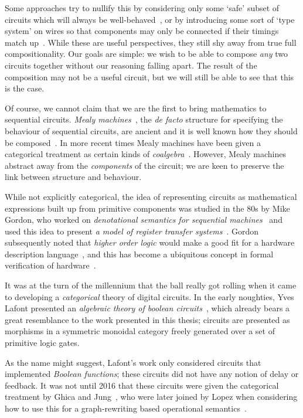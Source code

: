 Some approaches try to nullify this by considering only some `safe' subset of
circuits which will always be well-behaved~\cite{christensen2021wire}, or by
introducing some sort of `type system' on wires so that components may only be
connected if their timings match up~\cite{nigam2023modular}.
While these are useful perspectives, they still shy away from true full
compositionality.
Our goals are simple: we wish to be able to compose \emph{any} two circuits
together without our reasoning falling apart.
The result of the composition may not be a useful circuit, but we will still
be able to see that this is the case.

Of course, we cannot claim that we are the first to bring mathematics to
sequential circuits.
\emph{Mealy machines}~\cite{mealy1955method}, the \emph{de facto} structure for
specifying the behaviour of sequential circuits, are ancient and it is well
known how they should be composed~\cite{ginzburg2014algebraic}.
In more recent times Mealy machines have been given a categorical treatment as
certain kinds of \emph{coalgebra}~\cite{rutten2006algebraic,bonsangue2008coalgebraic}.
However, Mealy machines abstract away from the \emph{components} of the circuit;
we are keen to preserve the link between structure and behaviour.

While not explicitly categorical, the idea of representing circuits as
mathematical expressions built up from primitive components was studied in the
80s by Mike Gordon, who worked on
\emph{denotational semantics for sequential machines}~\cite{gordon1980denotational}
and used this idea to present
\emph{a model of register transfer systems}~\cite{gordon1982model}.
Gordon subsequently noted that \emph{higher order logic} would make a good fit
for a hardware description language~\cite{gordon1985why}, and this has become
a ubiquitous concept in formal verification of hardware~\cite{gupta1992formal}.

It was at the turn of the millennium that the ball really got rolling when it
came to developing a \emph{categorical} theory of digital circuits.
In the early noughties, Yves Lafont presented an
\emph{algebraic theory of boolean circuits}~\cite{lafont2003algebraic}, which
already bears a great resemblance to the work presented in this thesis; circuits
are presented as morphisms in a symmetric monoidal category freely generated
over a set of primitive logic gates.

As the name might suggest, Lafont's work only considered circuits that
implemented \emph{Boolean functions}; these circuits did not have any notion of
delay or feedback.
It was not until 2016 that these circuits were given the categorical treatment
by Ghica and Jung~\cite{ghica2016categorical}, who were later joined
by Lopez when considering how to use this for a graph-rewriting based
operational semantics~\cite{ghica2017diagrammatic}.

